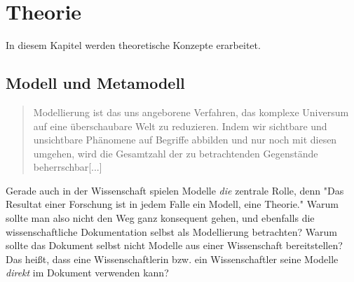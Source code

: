 




\chapter{Theorie}

In diesem Kapitel werden theoretische Konzepte erarbeitet.

\section{Modell und Metamodell}

\begin{quote}
Modellierung ist das uns angeborene Verfahren, das komplexe Universum auf eine überschaubare Welt zu reduzieren. Indem wir sichtbare und unsichtbare Phänomene auf Begriffe abbilden und nur noch mit diesen umgehen, wird die Gesamtzahl der zu betrachtenden Gegenstände beherrschbar[...]
\citep[S.~7]{ludewig}
\end{quote}

Gerade auch in der Wissenschaft spielen Modelle \emph{die} zentrale Rolle, denn
"Das Resultat einer Forschung ist in jedem Falle ein Modell, eine Theorie." \citep[S.~8]{ludewig}
Warum sollte man also nicht den Weg ganz konsequent gehen, und ebenfalls die wissenschaftliche
Dokumentation selbst als Modellierung betrachten?
Warum sollte das Dokument selbst nicht Modelle aus einer Wissenschaft bereitstellen?
Das heißt, dass eine Wissenschaftlerin bzw. ein Wissenschaftler seine Modelle \emph{direkt}
im Dokument verwenden kann?

